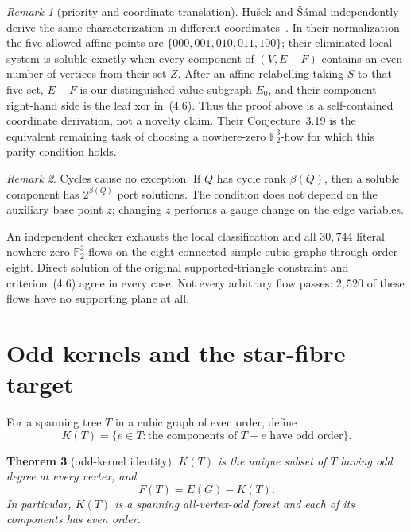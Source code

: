 \documentclass[11pt]{article}
\newtheorem{theorem}{Theorem}[section]
\theoremstyle{definition}
\theoremstyle{remark}
\newtheorem{remark}[theorem]{Remark}
\newcommand{\F}{\mathbb F}
\newcommand{\1}{\mathbf 1}
\begin{document}
\begin{remark}[priority and coordinate translation]
Hu\v{s}ek and \v{S}\'amal independently derive the same characterization
in different coordinates~\cite[Theorem~3.16]{HusekSamal2026}.  In their
normalization the five allowed affine points are
\(\{000,001,010,011,100\}\); their eliminated local system is soluble
exactly when every component of \((V,E-F)\) contains an even number of
vertices from their set \(Z\).  After an affine relabelling taking \(S\)
to that five-set, \(E-F\) is our distinguished value subgraph \(E_0\),
and their component right-hand side is the leaf xor in~(4.6).  Thus the
proof above is a self-contained coordinate derivation, not a novelty claim.
Their Conjecture~3.19 is the equivalent remaining task of choosing a
nowhere-zero \(\F_2^3\)-flow for which this parity condition holds.
\end{remark}

\begin{remark}
Cycles cause no exception.  If \(Q\) has cycle rank \(\beta(Q)\), then a
soluble component has \(2^{\beta(Q)}\) port solutions.  The condition does
not depend on the auxiliary base point \(z\); changing \(z\) performs a
gauge change on the edge variables.
\end{remark}

An independent checker exhausts the local classification and all
\(30{,}744\) literal nowhere-zero \(\F_2^3\)-flows on the eight connected
simple cubic graphs through order eight.  Direct solution of the original
supported-triangle constraint and criterion~(4.6) agree in every case.
Not every arbitrary flow passes: \(2{,}520\) of these flows have no
supporting plane at all.

\section{Odd kernels and the star-fibre target}

For a spanning tree \(T\) in a cubic graph of even order, define
\[
 K(T)=\{e\in T:\text{the components of \(T-e\) have odd order}\}. \tag{5.1}
\]

\begin{theorem}[odd-kernel identity]\label{thm:kernel}
\(K(T)\) is the unique subset of \(T\) having odd degree at every vertex,
and
\[
 F(T)=E(G)-K(T).                                          \tag{5.2}
\]
In particular, \(K(T)\) is a spanning all-vertex-odd forest and each of
its components has even order.
\end{theorem}
\end{document}
